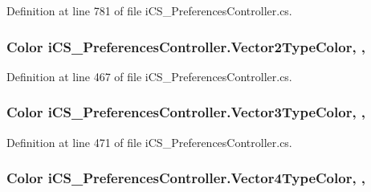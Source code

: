Definition at line 781 of file i\+C\+S\+\_\+\+Preferences\+Controller.\+cs.

\hypertarget{classi_c_s___preferences_controller_a9d989303122a70395fe1c2443ee2e9ad}{
\subsubsection[{Vector2\+Type\+Color}]{\setlength{\rightskip}{0pt plus 5cm}Color i\+C\+S\+\_\+\+Preferences\+Controller.\+Vector2\+Type\+Color\hspace{0.3cm}{\ttfamily [static]}, {\ttfamily [get]}, {\ttfamily [set]}}}\label{classi_c_s___preferences_controller_a9d989303122a70395fe1c2443ee2e9ad}


Definition at line 467 of file i\+C\+S\+\_\+\+Preferences\+Controller.\+cs.

\hypertarget{classi_c_s___preferences_controller_acec3d9946273c4bb88391b4f20677e7f}{
\subsubsection[{Vector3\+Type\+Color}]{\setlength{\rightskip}{0pt plus 5cm}Color i\+C\+S\+\_\+\+Preferences\+Controller.\+Vector3\+Type\+Color\hspace{0.3cm}{\ttfamily [static]}, {\ttfamily [get]}, {\ttfamily [set]}}}\label{classi_c_s___preferences_controller_acec3d9946273c4bb88391b4f20677e7f}


Definition at line 471 of file i\+C\+S\+\_\+\+Preferences\+Controller.\+cs.

\hypertarget{classi_c_s___preferences_controller_ab7c50b8ba536bbae66f0db236322f72b}{
\subsubsection[{Vector4\+Type\+Color}]{\setlength{\rightskip}{0pt plus 5cm}Color i\+C\+S\+\_\+\+Preferences\+Controller.\+Vector4\+Type\+Color\hspace{0.3cm}{\ttfamily [static]}, {\ttfamily [get]}, {\ttfamily [set]}}}\label{classi_c_s___preferences_controller_ab7c50b8ba536bbae66f0db236322f72b}


